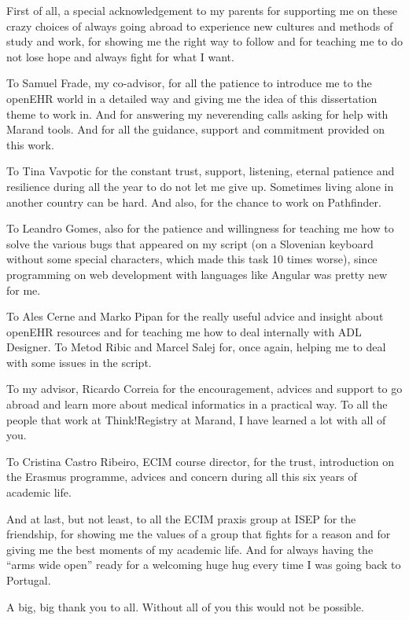 \documentclass[mim_thesis.tex]{subfiles}
\begin{document}
First of all, a special acknowledgement to my parents for supporting me on these crazy choices of always going abroad to experience new cultures and methods of study and work, for showing me the right way to follow and for teaching me to do not lose hope and always fight for what I want.

To Samuel Frade, my co-advisor, for all the patience to introduce me to the openEHR world in a detailed way and giving me the idea of this dissertation theme to work in. And for answering my neverending calls asking for help with Marand tools. And for all the guidance, support and commitment provided on this work. 

To Tina Vavpotic for the constant trust, support, listening, eternal patience and resilience during all the year to do not let me give up. Sometimes living alone in another country can be hard. And also, for the chance to work on Pathfinder.  

To Leandro Gomes, also for the patience and willingness for teaching me how to solve the various bugs that appeared on my script (on a Slovenian keyboard without some special characters, which made this task 10 times worse), since programming on web development with languages like Angular was pretty new for me.

To Ales Cerne and Marko Pipan for the really useful advice and insight about openEHR resources and for teaching me how to deal internally with ADL Designer. To Metod Ribic and Marcel Salej for, once again, helping me to deal with some issues in the script.

To my advisor, Ricardo Correia for the encouragement, advices and support to go abroad and learn more about medical informatics in a practical way.
To all the people that work at Think!Registry at Marand, I have learned a lot with all of you.

To Cristina Castro Ribeiro, ECIM course director, for the trust, introduction on the Erasmus programme, advices and concern during all this six years of academic life. 

And at last, but not least, to all the ECIM praxis group at ISEP for the friendship, for showing me the values of a group that fights for a reason and for giving me the best moments of my academic life. And for always having the “arms wide open” ready for a welcoming huge hug every time I was going back to Portugal. 

A big, big thank you to all. Without all of you this would not be possible.
\end{document}
